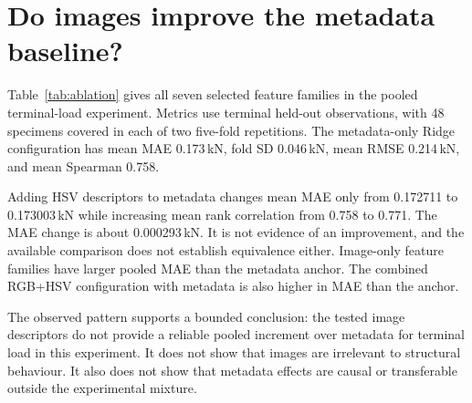 \section{Do images improve the metadata baseline?}\label{sec:ablation}
Table~\ref{tab:ablation} gives all seven selected feature families in the pooled terminal-load experiment. Metrics use terminal held-out observations, with 48 specimens covered in each of two five-fold repetitions. The metadata-only Ridge configuration has mean MAE 0.173\,kN, fold SD 0.046\,kN, mean RMSE 0.214\,kN, and mean Spearman 0.758.
\begin{table}[htbp]\centering\small
\caption{Pooled terminal-load comparison for 48 specimens across ten grouped folds. MAE and its sample SD are in kN; $R^2$ and Spearman $\rho$ are arithmetic means of fold metrics. Each feature family shows its selected model, chosen using the same saved folds. The table is an exploratory comparison, not a nested estimate of the model-selection procedure or a significance test.}\label{tab:ablation}

\end{table}
Adding HSV descriptors to metadata changes mean MAE only from 0.172711 to 0.173003\,kN while increasing mean rank correlation from 0.758 to 0.771. The MAE change is about 0.000293\,kN. It is not evidence of an improvement, and the available comparison does not establish equivalence either. Image-only feature families have larger pooled MAE than the metadata anchor. The combined RGB+HSV configuration with metadata is also higher in MAE than the anchor.


The observed pattern supports a bounded conclusion: the tested image descriptors do not provide a reliable pooled increment over metadata for terminal load in this experiment. It does not show that images are irrelevant to structural behaviour. It also does not show that metadata effects are causal or transferable outside the experimental mixture.

